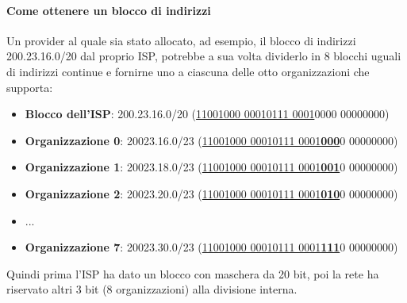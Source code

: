 \documentclass[11pt,a4paper]{article}
\begin{document}
\paragraph{Come ottenere un blocco di indirizzi}
Un provider al quale sia stato allocato, ad esempio, il blocco di indirizzi 200.23.16.0/20 dal proprio ISP, potrebbe a sua volta dividerlo in 8 blocchi uguali di indirizzi continue e fornirne uno a ciascuna delle otto organizzazioni che supporta:
\begin{itemize}
	\item \textbf{Blocco dell'ISP}: 200.23.16.0/20 (\underline{11001000 00010111 0001}0000 00000000)
	\item \textbf{Organizzazione 0}: 20023.16.0/23 (\underline{11001000 00010111 0001\textbf{000}}0 00000000)
	\item \textbf{Organizzazione 1}: 20023.18.0/23 (\underline{11001000 00010111 0001\textbf{001}}0 00000000)
	\item \textbf{Organizzazione 2}: 20023.20.0/23 (\underline{11001000 00010111 0001\textbf{010}}0 00000000)
	\item ...
	\item \textbf{Organizzazione 7}: 20023.30.0/23 (\underline{11001000 00010111 0001\textbf{111}}0 00000000)
\end{itemize}
Quindi prima l'ISP ha dato un blocco con maschera da 20 bit, poi la rete ha riservato altri 3 bit (8 organizzazioni) alla divisione interna. 
\end{document}
